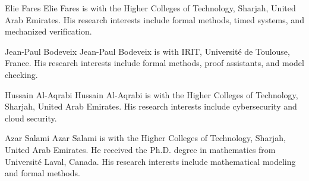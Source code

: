 \documentclass{ieeeaccess}
\begin{document}


\begin{IEEEbiographynophoto}{Elie Fares}
Elie Fares is with the Higher Colleges of Technology, Sharjah, United Arab
Emirates. His research interests include formal methods, timed systems, and
mechanized verification.
\end{IEEEbiographynophoto}

\begin{IEEEbiographynophoto}{Jean-Paul Bodeveix}
Jean-Paul Bodeveix is with IRIT, Universit\'e de Toulouse, France. His
research interests include formal methods, proof assistants, and model
checking.
\end{IEEEbiographynophoto}

\begin{IEEEbiographynophoto}{Hussain Al-Aqrabi}
Hussain Al-Aqrabi is with the Higher Colleges of Technology, Sharjah, United
Arab Emirates. His research interests include cybersecurity and cloud
security.
\end{IEEEbiographynophoto}

\begin{IEEEbiographynophoto}{Azar Salami}
Azar Salami is with the Higher Colleges of Technology, Sharjah, United Arab
Emirates. He received the Ph.D. degree in mathematics from Universit\'e Laval,
Canada. His research interests include mathematical modeling and formal
methods.\EOD
\end{IEEEbiographynophoto}
\end{document}
